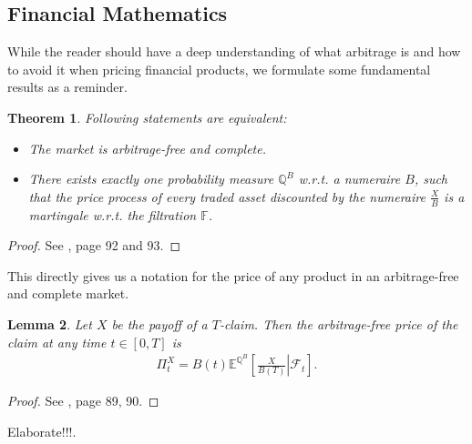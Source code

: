 \documentclass[12pt]{article}
\newtheorem{theorem}{Theorem}[section]
\newtheorem{lemma}[theorem]{Lemma}
\begin{document}
	\subsection{Financial Mathematics}
	While the reader should have a deep understanding of what arbitrage is and how to avoid it when pricing financial products, we formulate some fundamental results as a reminder.
	\begin{theorem}
		Following statements are equivalent:
		\begin{itemize}
			\item The market is arbitrage-free and complete.
			\item There exists exactly one probability measure $\mathbb{Q}^B$ w.r.t. a numeraire $B$, such that the price process of every traded asset discounted by the numeraire $\frac{X}{B}$ is a martingale w.r.t. the filtration $\mathbb{F}$.
		\end{itemize}
	\end{theorem}
	\begin{proof}
		See \cite{fima2Lecture}, page 92 and 93. %
	\end{proof}
	This directly gives us a notation for the price of any product in an arbitrage-free and complete market.
	\begin{lemma}
		Let $X$ be the payoff of a $T$-claim. Then the arbitrage-free price of the claim at any time $t\in \left[0, T\right]$ is
		\begin{align*}
			\Pi^X_t = B(t)\mathbb{E}^{\mathbb{Q}^B}\left[\left.\frac{X}{B(T)} \right| \mathcal{F}_t\right].
		\end{align*}
	\end{lemma}
	\begin{proof}
		See \cite{fima2Lecture}, page 89, 90. %
	\end{proof}
	 \color{red}Elaborate!!!\color{black}. 
	
	
\end{document}
